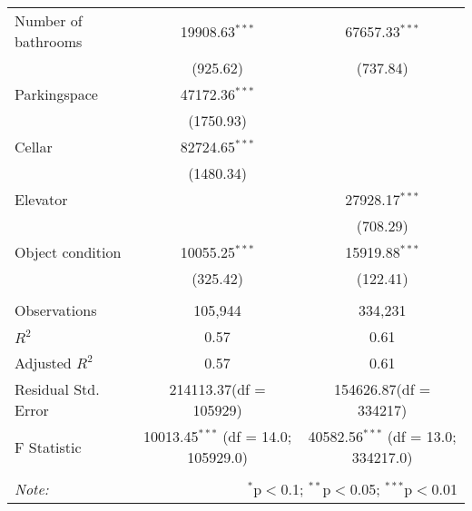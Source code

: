 \begin{table}[!htbp]
\begin{tabular}{@{\extracolsep{5pt}}lcc}
 Number of bathrooms & 19908.63$^{***}$ & 67657.33$^{***}$ \\
  & (925.62) & (737.84) \\
 Parkingspace & 47172.36$^{***}$ & \\
  & (1750.93) & \\
 Cellar & 82724.65$^{***}$ & \\
  & (1480.34) & \\
 Elevator & & 27928.17$^{***}$ \\
  & & (708.29) \\
 Object condition & 10055.25$^{***}$ & 15919.88$^{***}$ \\
  & (325.42) & (122.41) \\
\hline \\[-1.8ex]
 Observations & 105,944 & 334,231 \\
 $R^2$ & 0.57 & 0.61 \\
 Adjusted $R^2$ & 0.57 & 0.61 \\
 Residual Std. Error & 214113.37(df = 105929) & 154626.87(df = 334217)  \\
 F Statistic & 10013.45$^{***}$ (df = 14.0; 105929.0) & 40582.56$^{***}$ (df = 13.0; 334217.0) \\
\hline
\hline \\[-1.8ex]
\textit{Note:} & \multicolumn{2}{r}{$^{*}$p$<$0.1; $^{**}$p$<$0.05; $^{***}$p$<$0.01} \\
\end{tabular}
\end{table}